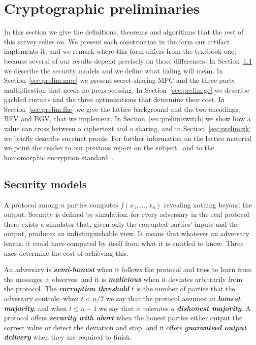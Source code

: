 \documentclass[11pt]{article}
\newcommand{\ib}[1]{\textbf{\emph{#1}}}
\begin{document}


\section{Cryptographic preliminaries}
\label{sec:prelim}

In this section we give the definitions, theorems and algorithms that the rest of this
survey relies on. We present each construction in the form our artifact implements it, and
we remark where this form differs from the textbook one, because several of our results
depend precisely on those differences. In Section~\ref{sec:prelim:model} we describe the
security models and we define what hiding will mean. In Section~\ref{sec:prelim:mpc} we
present secret-sharing MPC and the three-party multiplication that needs no preprocessing.
In Section~\ref{sec:prelim:gc} we describe garbled circuits and the three optimizations
that determine their cost. In Section~\ref{sec:prelim:fhe} we give the lattice background
and the two encodings, BFV and BGV, that we implement. In
Section~\ref{sec:prelim:switch} we show how a value can cross between a ciphertext and a
sharing, and in Section~\ref{sec:prelim:zk} we briefly describe succinct proofs. For
further information on the lattice material we point the reader to our previous report on
the subject~\cite{MoraisDahab} and to the homomorphic encryption
standard~\cite{HEStandard}.

\subsection{Security models}
\label{sec:prelim:model}

A protocol among $n$ parties computes $f(x_1,\dots,x_n)$ revealing nothing beyond the
output. Security is defined by simulation: for every adversary in the real protocol there
exists a simulator that, given only the corrupted parties' inputs and the output, produces
an indistinguishable view. It means that whatever an adversary learns, it could have
computed by itself from what it is entitled to know. Three axes determine the cost of
achieving this.

\begin{definition}
\label{def:corruption}
An adversary is \ib{semi-honest} when it follows the protocol and tries to learn from the
messages it observes, and it is \ib{malicious} when it deviates arbitrarily from the protocol.
The \ib{corruption threshold} $t$ is the number of parties that the adversary controls; when
$t < n/2$ we say that the protocol assumes an \ib{honest majority}, and when $t \le n-1$ we say
that it tolerates a \ib{dishonest majority}. A protocol offers \ib{security with abort} when
the honest parties either output the correct value or detect the deviation and stop, and it
offers \ib{guaranteed output delivery} when they are required to finish.
\end{definition}
\end{document}
